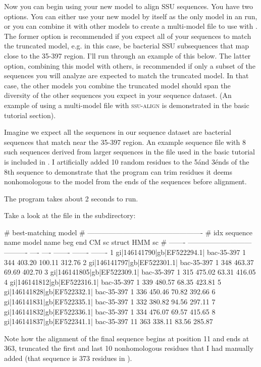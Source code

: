 Now you can begin using your new model  to align
SSU sequences. You have two options.  You can either use your new
model by itself as the only model in an  run, or you
can combine it with other models to create a multi-model file to use
with . The former option is recommended if you expect
all of your sequences to match the truncated model, e.g. in this case,
be bacterial SSU subsequences that map close to the 35-397
region. I'll run through an example of this below. The latter option,
combining this model with others, is recommended if only a subset of
the sequences you will analyze are expected to match the truncated
model. In that case, the other models you combine the truncated model
should span the diversity of the other sequences you expect in your
sequence dataset. (An example of using a multi-model file with
\textsc{ssu-align} is demonstrated in the basic tutorial section).

Imagine we expect all the sequences in our sequence dataset are
bacterial sequences that match near the 35-397 region. An example
sequence file with 8 such sequences derived from larger sequences in
the  file used in the basic tutorial is included in
. I artificially added 10 random residues to the 5\' and 3\'
ends of the 8th sequence to demonstrate that the program can 
trim residues it deems nonhomologous to the model from the ends of
the sequences before alignment.


The program takes about 2 seconds to run. 

Take a look at the  file in the 
subdirectory:

\begin{sreoutput}
#                                                      best-matching model                 
#                                       -------------------------------------------------  
#     idx  sequence name                model name   beg   end    CM sc   struct   HMM sc
# -------  ---------------------------  ----------  ----  ----  -------  -------  -------
        1  gi|146141790|gb|EF522294.1|  bac-35-397     1   344   403.20   100.11   312.76
        2  gi|146141797|gb|EF522301.1|  bac-35-397     1   348   463.37    69.69   402.70
        3  gi|146141805|gb|EF522309.1|  bac-35-397     1   315   475.02    63.31   416.05
        4  gi|146141812|gb|EF522316.1|  bac-35-397     1   339   480.57    68.35   423.81
        5  gi|146141828|gb|EF522332.1|  bac-35-397     1   336   450.46    70.82   392.66
        6  gi|146141831|gb|EF522335.1|  bac-35-397     1   332   380.82    94.56   297.11
        7  gi|146141832|gb|EF522336.1|  bac-35-397     1   334   476.07    69.57   415.65
        8  gi|146141837|gb|EF522341.1|  bac-35-397    11   363   338.11    83.56   285.87
\end{sreoutput}

Note how the alignment of the final sequence begins at position 11 and
ends at 363, truncated the first and last 10 nonhomologous residues
that I had manually added (that sequence is 373 residues in
).
